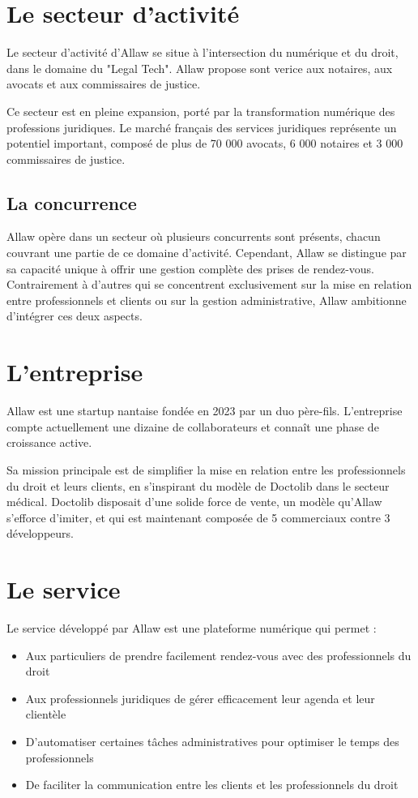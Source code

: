 \section{Le secteur d'activité}
Le secteur d'activité d'Allaw se situe à l'intersection du numérique et du droit, 
dans le domaine du "Legal Tech". Allaw propose sont verice aux notaires,
aux avocats et aux commissaires de justice.

Ce secteur est en pleine expansion, porté par la transformation numérique des
professions juridiques. Le marché français des services juridiques représente un
potentiel important, composé de plus de 70 000 avocats, 6 000 notaires et 3 000
commissaires de justice.

\subsection{La concurrence}
Allaw opère dans un secteur où plusieurs concurrents sont présents, chacun
couvrant une partie de ce domaine d'activité. Cependant, Allaw se distingue
par sa capacité unique à offrir une gestion complète des prises de rendez-vous.
Contrairement à d'autres qui se concentrent exclusivement sur la mise en
relation entre professionnels et clients ou sur la gestion administrative, Allaw
ambitionne d'intégrer ces deux aspects.

\section{L'entreprise}
Allaw est une startup nantaise fondée en 2023 par un duo père-fils. L'entreprise 
compte actuellement une dizaine de collaborateurs et connaît une phase de croissance 
active.

Sa mission principale est de simplifier la mise en relation entre les
professionnels du droit et leurs clients, en s'inspirant du modèle de Doctolib
dans le secteur médical. Doctolib disposait d'une solide force de vente,
un modèle qu'Allaw s'efforce d'imiter, et qui est maintenant composée de 5
commerciaux contre 3 développeurs.

\section{Le service}
Le service développé par Allaw est une plateforme numérique qui permet :
\begin{itemize}
    \item Aux particuliers de prendre facilement rendez-vous avec des professionnels du droit
    \item Aux professionnels juridiques de gérer efficacement leur agenda et leur clientèle
    \item D'automatiser certaines tâches administratives pour optimiser le temps des professionnels
    \item De faciliter la communication entre les clients et les professionnels du droit
\end{itemize}

